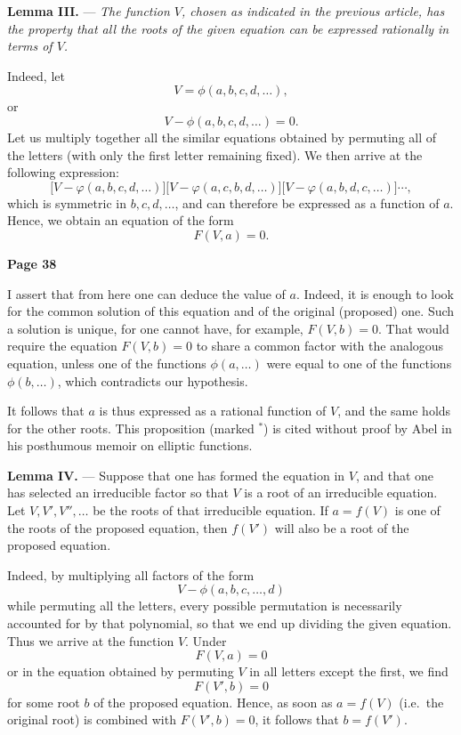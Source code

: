 \documentclass{article}
\begin{document}
\medskip

\textbf{Lemma III.} --- \textit{The function \(V\), chosen as indicated in the previous article, has the property that all the roots of the given equation can be expressed rationally in terms of \(V\).}

\smallskip

Indeed, let
\[
V = \phi(a, b, c, d, \dots),
\]
or
\[
V - \phi(a, b, c, d, \dots) = 0.
\]
Let us multiply together all the similar equations obtained by permuting 
all of the letters (with only the first letter remaining fixed). We then arrive 
at the following expression:
\[
\bigl[V - \varphi(a, b, c, d,\dots)\bigr]
\bigl[V - \varphi(a, c, b, d,\dots)\bigr]
\bigl[V - \varphi(a, b, d, c,\dots)\bigr]
\cdots,
\]
which is symmetric in $b, c, d,\dots$, and can therefore be expressed 
as a function of $a$. Hence, we obtain an equation of the form
\[
F(V, a) = 0.
\]

\newpage


\centerline{\textbf{Page 38}}

\medskip

\noindent
I assert that from here one can deduce the value of \(a\). Indeed, it is enough to look for the common solution of this equation and of the original (proposed) one. Such a solution is unique, for one cannot have, for example, \(F(V, b) = 0\). That would require the equation \(F(V, b) = 0\) to share a common factor with the analogous equation, unless one of the functions \(\phi(a, \dots)\) were equal to one of the functions \(\phi(b, \dots)\), which contradicts our hypothesis.

\smallskip

\noindent
It follows that \(a\) is thus expressed as a rational function of \(V\), and the same holds for the other roots. This proposition (marked \(^*\)) is cited without proof by Abel in his posthumous memoir on elliptic functions.

\medskip

\noindent
\textbf{Lemma IV.} --- Suppose that one has formed the equation in \(V\), and that one has selected an irreducible factor so that \(V\) is a root of an irreducible equation. Let \(V, V', V'', \dots\) be the roots of that irreducible equation. If \(a = f(V)\) is one of the roots of the proposed equation, then \(f(V')\) will also be a root of the proposed equation.

\smallskip

\noindent
Indeed, by multiplying all factors of the form
\[
V - \phi(a, b, c, \dots, d)
\]
while permuting all the letters, every possible permutation is necessarily accounted for by that polynomial, so that we end up dividing the given equation. Thus we arrive at the function \(V\). Under
\[
F(V, a) = 0
\]
or in the equation obtained by permuting \(V\) in all letters except the first, we find
\[
F(V', b) = 0
\]
for some root \(b\) of the proposed equation. Hence, as soon as \(a = f(V)\) (i.e.\ the original root) is combined with \(F(V', b) = 0\), it follows that \(b = f(V')\).
\end{document}
